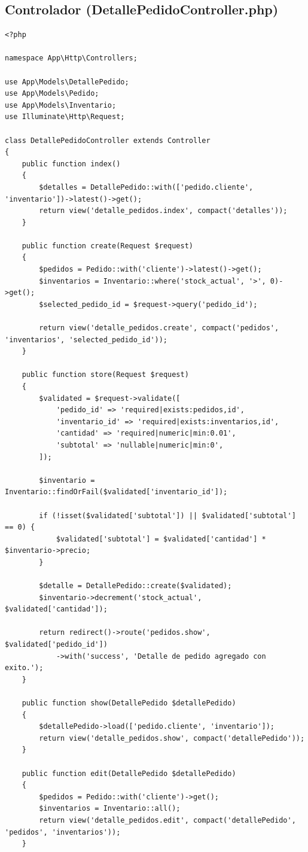 \documentclass[12pt, letterpaper]{article}
\begin{document}
\subsection{Controlador (DetallePedidoController.php)}
\begin{lstlisting}[language=purePHP]
<?php

namespace App\Http\Controllers;

use App\Models\DetallePedido;
use App\Models\Pedido;
use App\Models\Inventario;
use Illuminate\Http\Request;

class DetallePedidoController extends Controller
{
    public function index()
    {
        $detalles = DetallePedido::with(['pedido.cliente', 'inventario'])->latest()->get();
        return view('detalle_pedidos.index', compact('detalles'));
    }

    public function create(Request $request)
    {
        $pedidos = Pedido::with('cliente')->latest()->get();
        $inventarios = Inventario::where('stock_actual', '>', 0)->get();
        $selected_pedido_id = $request->query('pedido_id');

        return view('detalle_pedidos.create', compact('pedidos', 'inventarios', 'selected_pedido_id'));
    }

    public function store(Request $request)
    {
        $validated = $request->validate([
            'pedido_id' => 'required|exists:pedidos,id',
            'inventario_id' => 'required|exists:inventarios,id',
            'cantidad' => 'required|numeric|min:0.01',
            'subtotal' => 'nullable|numeric|min:0',
        ]);

        $inventario = Inventario::findOrFail($validated['inventario_id']);

        if (!isset($validated['subtotal']) || $validated['subtotal'] == 0) {
            $validated['subtotal'] = $validated['cantidad'] * $inventario->precio;
        }

        $detalle = DetallePedido::create($validated);
        $inventario->decrement('stock_actual', $validated['cantidad']);

        return redirect()->route('pedidos.show', $validated['pedido_id'])
            ->with('success', 'Detalle de pedido agregado con exito.');
    }

    public function show(DetallePedido $detallePedido)
    {
        $detallePedido->load(['pedido.cliente', 'inventario']);
        return view('detalle_pedidos.show', compact('detallePedido'));
    }

    public function edit(DetallePedido $detallePedido)
    {
        $pedidos = Pedido::with('cliente')->get();
        $inventarios = Inventario::all();
        return view('detalle_pedidos.edit', compact('detallePedido', 'pedidos', 'inventarios'));
    }


\end{lstlisting}
\end{document}
